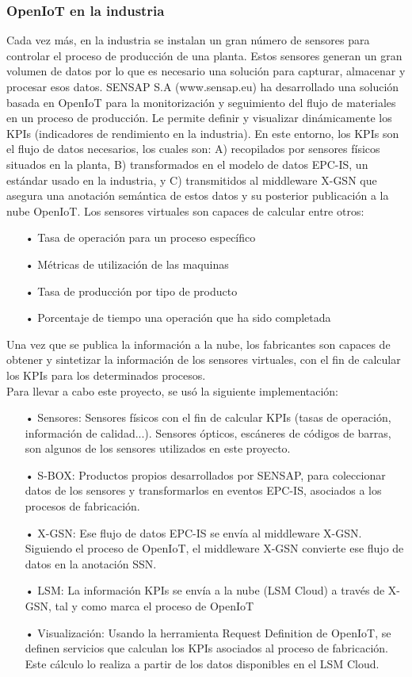 \documentclass[12pt, twoside]{book}
\begin{document}
\subsubsection{OpenIoT en la industria}
Cada vez más, en la industria se instalan un gran número de sensores para controlar el proceso de producción de una planta. Estos sensores generan un gran volumen de datos por lo que es necesario una solución para capturar, almacenar y procesar esos datos. SENSAP S.A (www.sensap.eu) ha desarrollado una solución basada en OpenIoT para la monitorización y seguimiento del flujo de materiales en un proceso de producción. Le permite definir y visualizar dinámicamente los KPIs (indicadores de rendimiento en la industria). En este entorno, los KPIs son el flujo de datos necesarios, los cuales son: A) recopilados por sensores físicos situados en la planta, B) transformados en el modelo de datos EPC-IS, un estándar usado en la industria, y C) transmitidos al middleware X-GSN que asegura una anotación semántica de estos datos y su posterior publicación a la nube OpenIoT. Los sensores virtuales son capaces de calcular entre otros: \\
\begin{itemize}
\item[•] Tasa de operación para un proceso específico
\item[•] Métricas de utilización de las maquinas
\item[•] Tasa de producción por tipo de producto
\item[•] Porcentaje de tiempo una operación que ha sido completada
\end{itemize} 

Una vez que se publica la información a la nube, los fabricantes son capaces de obtener y sintetizar la información de los sensores virtuales, con el fin de calcular los KPIs para los determinados procesos.\\

Para llevar a cabo este proyecto, se usó la siguiente implementación:\\
\begin{itemize}
\item[•] Sensores: Sensores físicos con el fin de calcular KPIs (tasas de operación, información de calidad...). Sensores ópticos, escáneres de códigos de barras, son algunos de los sensores utilizados en este proyecto.
\item[•] S-BOX: Productos propios desarrollados por SENSAP, para coleccionar datos de los sensores y transformarlos en eventos EPC-IS, asociados a los procesos de fabricación.
\item[•] X-GSN: Ese flujo de datos EPC-IS se envía al middleware X-GSN. Siguiendo el proceso de OpenIoT, el middleware X-GSN convierte ese flujo de datos en la anotación SSN.
\item[•] LSM: La información KPIs se envía a la nube (LSM Cloud) a través de X-GSN, tal y como marca el proceso de OpenIoT
\item[•] Visualización: Usando la herramienta Request Definition de OpenIoT, se definen servicios que calculan los KPIs asociados al proceso de fabricación. Este cálculo lo realiza a partir de los datos disponibles en el LSM Cloud. 
\end{itemize}
\end{document}
